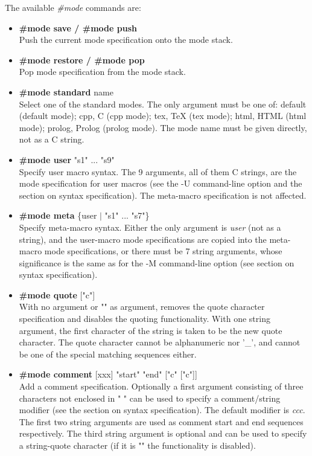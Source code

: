 The available {\it \#mode} commands are:
\begin{itemize}
\item
{\bf \#mode save / \#mode push} \\
Push the current mode specification onto the mode stack.
\item
{\bf \#mode restore / \#mode pop} \\
Pop mode specification from the mode stack.
\item
{\bf \#mode standard } name\\
Select one of the standard modes. The only argument must be one of:
default (default mode); cpp, C (cpp mode); tex, TeX (tex mode); html,
HTML (html mode); prolog, Prolog (prolog mode). The mode name must be
given directly, not as a C string.
\item
{\bf \#mode user } "s1" ... "s9"\\
Specify user macro syntax.
The 9 arguments, all of them C strings, are the mode specification for
user macros (see the -U command-line option and the section on syntax
specification). The meta-macro specification is not affected.
\item
{\bf \#mode meta } \{user $|$ "s1" ... "s7"\}\\
Specify meta-macro syntax.
Either the only argument is {\it user} (not as a string), and the user-macro
mode specifications are copied into the meta-macro mode specifications,
or there must be 7 string arguments, whose significance is the same as
for the -M command-line option (see section on syntax specification).
\item
{\bf \#mode quote } ["c"]\\
With no argument or "" as argument, removes the quote character
specification and disables the quoting functionality. With one string
argument, the first character of the string is taken to be the new
quote character. The quote character cannot be alphanumeric nor '\_',
and cannot be one of the special matching sequences either.
\item
{\bf \#mode comment } [xxx] "start" "end" ["c" ["c"]]\\
Add a comment specification. Optionally a first argument consisting of
three characters not enclosed in " " can be used to specify a comment/string
modifier (see the section on syntax specification). The default modifier
is {\it ccc}. The first two string
arguments are used as comment start and end sequences respectively.
The third string argument is optional and can be used to specify a
string-quote character (if it is "" the functionality is disabled).

\end{itemize}
